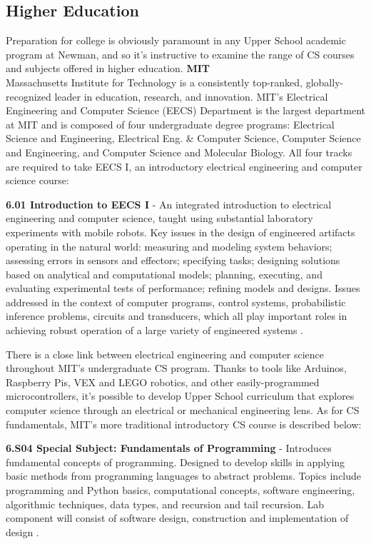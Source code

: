 \subsection{Higher Education}
Preparation for college is obviously paramount in any Upper School academic program at Newman, and so it's instructive to examine the range of CS courses and subjects offered in higher education. 
\textbf{MIT} \\
Massachusetts Institute for Technology is a consistently top-ranked, globally-recognized leader in education, research, and innovation. MIT's Electrical Engineering and Computer Science (EECS) Department is the largest department at MIT and is composed of four undergraduate degree programs: Electrical Science and Engineering, Electrical Eng. \& Computer Science, Computer Science and Engineering, and Computer Science and Molecular Biology. All four tracks are required to take EECS I, an introductory electrical engineering and computer science course:
\begin{blockquote}
\textbf{6.01 Introduction to EECS I} - An integrated introduction to electrical engineering and computer science, taught using substantial laboratory experiments with mobile robots. Key issues in the design of engineered artifacts operating in the natural world: measuring and modeling system behaviors; assessing errors in sensors and effectors; specifying tasks; designing solutions based on analytical and computational models; planning, executing, and evaluating experimental tests of performance; refining models and designs. Issues addressed in the context of computer programs, control systems, probabilistic inference problems, circuits and transducers, which all play important roles in achieving robust operation of a large variety of engineered systems \cite{mit}.
\end{blockquote}
There is a close link between electrical engineering and computer science throughout MIT's undergraduate CS program. Thanks to tools like Arduinos, Raspberry Pis, VEX and LEGO robotics, and other easily-programmed microcontrollers, it's possible to develop Upper School curriculum that explores computer science through an electrical or mechanical engineering lens. As for CS fundamentals, MIT's more traditional introductory CS course is described below:
\begin{blockquote}
	\textbf{6.S04 Special Subject: Fundamentals of Programming} - Introduces fundamental concepts of programming. Designed to develop skills in applying basic methods from programming languages to abstract problems. Topics include programming and Python basics, computational concepts, software engineering, algorithmic techniques, data types, and recursion and tail recursion. Lab component will consist of software design, construction and implementation of design \cite{mit}. 
	\end{blockquote} \par
